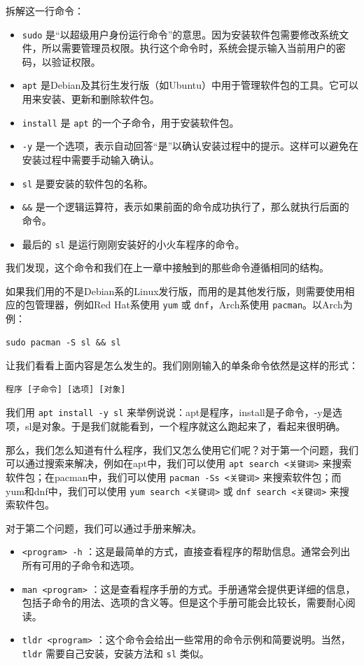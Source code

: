拆解这一行命令：
\begin{itemize}
    \item \texttt{sudo} 是“以超级用户身份运行命令”的意思。因为安装软件包需要修改系统文件，所以需要管理员权限。执行这个命令时，系统会提示输入当前用户的密码，以验证权限。
    \item \texttt{apt} 是Debian及其衍生发行版（如Ubuntu）中用于管理软件包的工具。它可以用来安装、更新和删除软件包。
    \item \texttt{install} 是 \texttt{apt} 的一个子命令，用于安装软件包。
    \item \texttt{-y} 是一个选项，表示自动回答“是”以确认安装过程中的提示。这样可以避免在安装过程中需要手动输入确认。
    \item \texttt{sl} 是要安装的软件包的名称。
    \item \texttt{\&\&} 是一个逻辑运算符，表示如果前面的命令成功执行了，那么就执行后面的命令。
    \item 最后的 \texttt{sl} 是运行刚刚安装好的小火车程序的命令。
\end{itemize}

我们发现，这个命令和我们在上一章中接触到的那些命令遵循相同的结构。

如果我们用的不是Debian系的Linux发行版，而用的是其他发行版，则需要使用相应的包管理器，例如Red Hat系使用 \texttt{yum} 或 \texttt{dnf}，Arch系使用 \texttt{pacman}。以Arch为例：
\begin{verbatim}
sudo pacman -S sl && sl
\end{verbatim}

让我们看看上面内容是怎么发生的。我们刚刚输入的单条命令依然是这样的形式：
\begin{verbatim}
程序 [子命令] [选项] [对象]
\end{verbatim}

我们用 \texttt{apt install -y sl} 来举例说说：apt是程序，install是子命令，-y是选项，sl是对象。于是我们就能看到，一个程序就这么跑起来了，看起来很明确。

那么，我们怎么知道有什么程序，我们又怎么使用它们呢？对于第一个问题，我们可以通过搜索来解决，例如在apt中，我们可以使用 \texttt{apt search <关键词>} 来搜索软件包；在pacman中，我们可以使用 \texttt{pacman -Ss <关键词>} 来搜索软件包；而yum和dnf中，我们可以使用 \texttt{yum search <关键词>} 或 \texttt{dnf search <关键词>} 来搜索软件包。

对于第二个问题，我们可以通过手册来解决。

\begin{itemize}
  \item  \texttt{<program> -h} ：这是最简单的方式，直接查看程序的帮助信息。通常会列出所有可用的子命令和选项。
  \item  \texttt{man <program>} ：这是查看程序手册的方式。手册通常会提供更详细的信息，包括子命令的用法、选项的含义等。但是这个手册可能会比较长，需要耐心阅读。
  \item  \texttt{tldr <program>} ：这个命令会给出一些常用的命令示例和简要说明。当然， \texttt{tldr} 需要自己安装，安装方法和 \texttt{sl} 类似。
\end{itemize}

